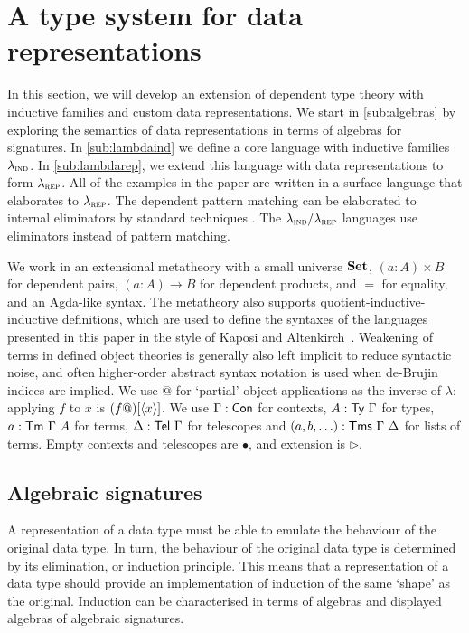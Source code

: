 \section{A type system for data representations}\label{sec:type-system}


In this section, we will develop an extension of dependent type theory with
inductive families and custom data representations. We start in
\cref{sub:algebras} by exploring the semantics of data representations in terms
of algebras for signatures. In \cref{sub:lambdaind}
we define a core language with inductive families $\lambda_{\textsc{ind}}$. In
\cref{sub:lambdarep}, we extend this language with data representations to form
$\lambda_{\textsc{rep}}$. All of the examples in the paper are written in a surface language
that elaborates to $\lambda_{\textsc{rep}}$. The dependent pattern matching can be
elaborated to internal eliminators by standard techniques
\cite{Goguen2006-sy,Cockx2018-fk}. The $\lambda_{\textsc{ind}}/\lambda_{\textsc{rep}}$ languages use eliminators instead
of pattern matching.

We work in an extensional metatheory with a small universe $\mathbf{Set}$, $(a : A)
\times B$ for dependent pairs, $(a : A) \to B$ for dependent products, and $=$
for equality, and an Agda-like syntax. The metatheory also supports
quotient-inductive-inductive definitions, which are used to define the syntaxes
of the languages presented in this paper in the style of Kaposi and
Altenkirch~\cite{Altenkirch2016-zc}. Weakening of terms in defined object
theories is generally also left implicit to reduce syntactic noise, and often
higher-order abstract syntax notation is used when de-Brujin indices are
implied. We use $@$ for `partial' object applications as the inverse of
$\lambda$: applying $f$ to $x$ is $(f @)[\langle x\rangle]$. We use $\Gamma : \textsf{Con}$ for
contexts, $A : \textsf{Ty}\ \Gamma$ for types, $a : \textsf{Tm}\ \Gamma\ A$ for terms,
$\Delta : \textsf{Tel}\ \Gamma$ for telescopes and $(a, b, \ldots) : \textsf{Tms}\
\Gamma\ \Delta$ for lists of terms. Empty contexts and telescopes are $\bullet$,
and extension is $\rhd$.

\newcommand{\ValidCase}{\mta{ValidCase}}

\subsection{Algebraic signatures}

A representation of a data type must be able to emulate the behaviour of the
original data type. In turn, the behaviour of the original data type is
determined by its elimination, or induction principle. This means that a
representation of a data type should provide an implementation of induction of
the same `shape' as the original. Induction can be characterised in terms of
algebras and displayed algebras of algebraic signatures.

